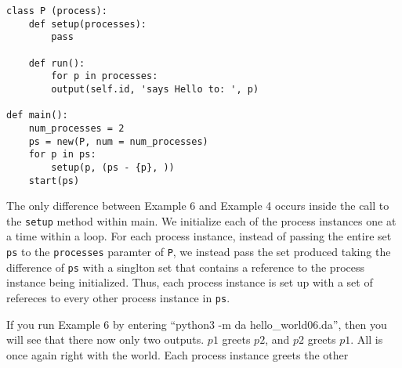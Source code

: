 \documentclass[11pt]{article}
\begin{document}
\begin{lstlisting}[caption={hello\_world06.da - Excluding Self-References, the Nice Way}, label={lst:hw06}]
class P (process):
    def setup(processes):
        pass

    def run():
        for p in processes:
        output(self.id, 'says Hello to: ', p)

def main():
    num_processes = 2
    ps = new(P, num = num_processes)
    for p in ps:
        setup(p, (ps - {p}, ))
    start(ps)
\end{lstlisting}

The only difference between Example 6 and Example 4 occurs inside the call to
the \texttt{setup} method within main. We initialize each of the process
instances one at a time within a loop. For each process instance, instead of
passing the entire set \texttt{ps} to the \texttt{processes} paramter of
\texttt{P}, we instead pass the set produced taking the difference of
\texttt{ps} with a singlton set that contains a reference to the process
instance being initialized. Thus, each process instance is set up with a set of
refereces to every other process instance in \texttt{ps}.

If you run Example 6 by entering ``python3 -m da hello\_world06.da'', then you
will see that there now only two outputs. $p1$ greets $p2$, and $p2$ greets
$p1$. All is once again right with the world. Each process instance greets the
other
\end{document}
